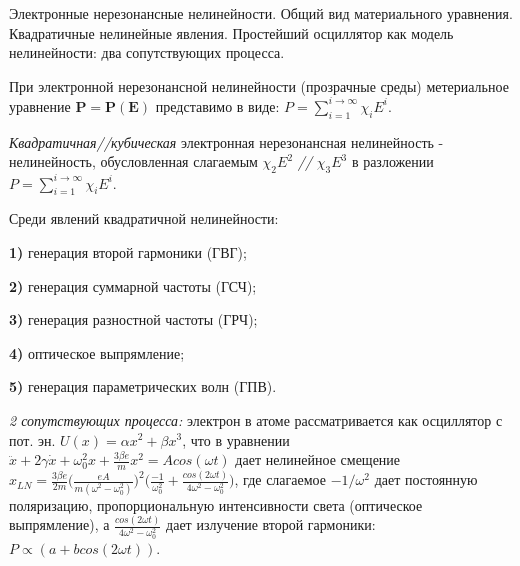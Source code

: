 
\begin{leftrules}
Электронные нерезонансные нелинейности. Общий вид материального уравнения. Квадратичные нелинейные явления. Простейший осциллятор как модель нелинейности: два сопутствующих процесса.
\end{leftrules}



При электронной нерезонансной нелинейности (прозрачные среды) метериальное уравнение $\mathbf{P}=\mathbf{P}(\mathbf{E})$ представимо в виде: $P=\sum\limits_{i=1}^{i \to \infty} \chi_{i} E^{i}$.

\begin{to_def}
    \textit{Квадратичная//кубическая} электронная нерезонансная нелинейность - нелинейность, обусловленная слагаемым $\chi_{2} E^{2}$ \textit{//} $\chi_{3} E^{3}$ в разложении $P=\sum\limits_{i=1}^{i \to \infty} \chi_{i} E^{i}$.
\end{to_def}

Среди явлений квадратичной нелинейности: \\
    \par \textbf{1)} генерация второй гармоники (ГВГ); \\
    \par \textbf{2)} генерация суммарной частоты (ГСЧ); \\
    \par \textbf{3)} генерация разностной частоты (ГРЧ); \\
    \par \textbf{4)} оптическое выпрямление; \\
    \par \textbf{5)} генерация параметрических волн (ГПВ).


\textit{2 сопутствующих процесса:} электрон в атоме рассматривается как осциллятор с пот. эн. $U(x)=\alpha x^{2} + \beta x^{3}$, что в уравнении $\ddot{x} + 2\gamma \dot{x} + \omega_{0}^{2} x + \frac{3\beta e}{m} x^{2} = Acos(\omega t)$ дает нелинейное смещение $x_{LN} = \frac{3\beta e}{2m} \Big( \frac{eA}{m(\omega^{2}-\omega_{0}^{2})} \Big)^{2} \Big( \frac{-1}{\omega_{0}^{2}} + \frac{cos(2\omega t)}{4\omega^{2}-\omega_{0}^{2}} \Big)$, где слагаемое $-1/\omega^{2}$ дает постоянную поляризацию, пропорциональную интенсивности света (оптическое выпрямление), а $\frac{cos(2\omega t)}{4\omega^{2}-\omega_{0}^{2}}$ дает излучение второй гармоники: \\ $P \propto (a+bcos(2\omega t))$.
